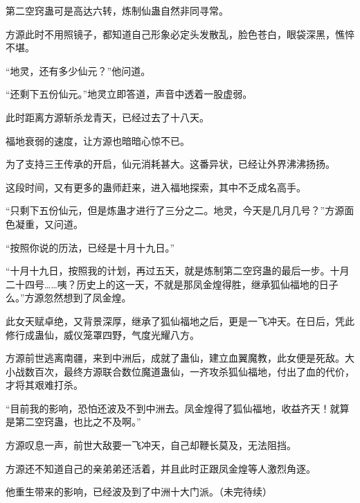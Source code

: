 \begin{this_body}
第二空窍蛊可是高达六转，炼制仙蛊自然非同寻常。

方源此时不用照镜子，都知道自己形象必定头发散乱，脸色苍白，眼袋深黑，憔悴不堪。

“地灵，还有多少仙元？”他问道。

“还剩下五份仙元。”地灵立即答道，声音中透着一股虚弱。

此时距离方源斩杀龙青天，已经过去了十八天。

福地衰弱的速度，让方源也暗暗心惊不已。

为了支持三王传承的开启，仙元消耗甚大。这番异状，已经让外界沸沸扬扬。

这段时间，又有更多的蛊师赶来，进入福地探索，其中不乏成名高手。

“只剩下五份仙元，但是炼蛊才进行了三分之二。地灵，今天是几月几号？”方源面色凝重，又问道。

“按照你说的历法，已经是十月十九日。”

“十月十九日，按照我的计划，再过五天，就是炼制第二空窍蛊的最后一步。十月二十四号……咦？历史上的这一天，不就是那凤金煌得胜，继承狐仙福地的日子么。”方源忽然想到了凤金煌。

此女天赋卓绝，又背景深厚，继承了狐仙福地之后，更是一飞冲天。在日后，凭此修行成蛊仙，威仪笼罩四野，气度光耀八方。

方源前世逃离南疆，来到中洲后，成就了蛊仙，建立血翼魔教，此女便是死敌。大小战数百次，最终方源联合数位魔道蛊仙，一齐攻杀狐仙福地，付出了血的代价，才将其艰难打杀。

“目前我的影响，恐怕还波及不到中洲去。凤金煌得了狐仙福地，收益齐天！就算是第二空窍蛊，也比之不及啊。”

方源叹息一声，前世大敌要一飞冲天，自己却鞭长莫及，无法阻挡。

方源还不知道自己的亲弟弟还活着，并且此时正跟凤金煌等人激烈角逐。

他重生带来的影响，已经波及到了中洲十大门派。（未完待续）

\end{this_body}

